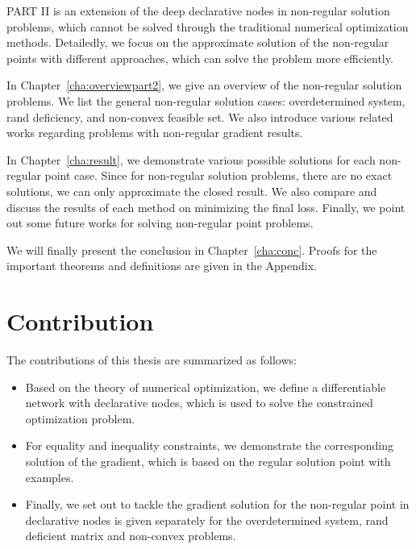 \par PART II is an extension of the deep declarative nodes in non-regular solution problems, which cannot be solved through the traditional numerical optimization methods. Detailedly, we focus on the approximate solution of the non-regular points with different approaches, which can solve the problem more efficiently. 
\begin{description}
    \item In Chapter~\ref{cha:overviewpart2}, we give an overview of the non-regular solution problems. We list the general non-regular solution cases: overdetermined system, rand deficiency, and non-convex feasible set. We also introduce various related works regarding problems with non-regular gradient results. 
    \item In Chapter~\ref{cha:result}, we demonstrate various possible solutions for each non-regular point case. Since for non-regular solution problems, there are no exact solutions, we can only approximate the closed result. We also compare and discuss the results of each method on minimizing the final loss. Finally, we point out some future works for solving non-regular point problems. 
\end{description}
We will finally present the conclusion in Chapter~\ref{cha:conc}. Proofs for the important theorems and definitions are given in the Appendix.

\section{Contribution}
\label{sec.contribution}
The contributions of this thesis are summarized as follows: 
\begin{itemize}
    \item Based on the theory of numerical optimization, we define a differentiable network with declarative nodes, which is used to solve the constrained optimization problem. 
    \item For equality and inequality constraints, we demonstrate the corresponding solution of the gradient, which is based on the regular solution point with examples.
    \item Finally, we set out to tackle the gradient solution for the non-regular point in declarative nodes is given separately for the overdetermined system, rand deficient matrix and non-convex problems.
\end{itemize}